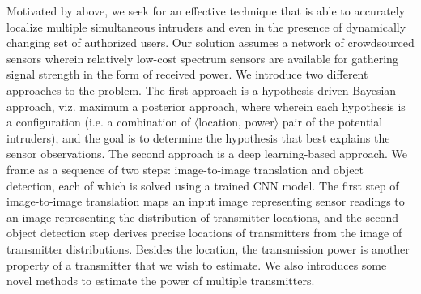 Motivated by above, we seek for an effective technique that is able to accurately localize multiple simultaneous
intruders and even in the presence of dynamically changing set of authorized users.
Our solution assumes a network of crowdsourced sensors wherein relatively low-cost spectrum sensors are available
for gathering signal strength in the form of received power.
We introduce two different approaches to the \mtl problem.
The first approach is a hypothesis-driven Bayesian approach, viz. maximum a posterior approach, where wherein each hypothesis is a configuration
(i.e. a combination of $\langle$location, power$\rangle$ pair of the potential intruders), and the goal is to determine the hypothesis 
that best explains the sensor observations.
The second approach is a deep learning-based approach. We frame \mtl as a sequence of two steps: image-to-image translation 
and object detection, each of which is solved using a trained CNN model. 
The first step of image-to-image translation maps an input image representing sensor readings to an image
representing the distribution of transmitter locations, and the second object detection step derives precise locations of
transmitters from the image of transmitter distributions. 
Besides the location, the transmission power is another property of a transmitter that we wish to estimate.
We also introduces some novel methods to estimate the power of multiple transmitters.

